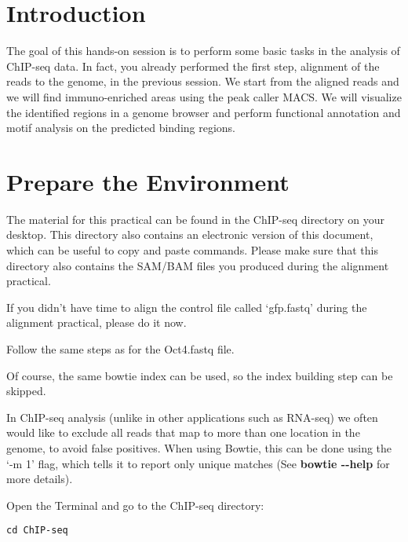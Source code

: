 \newpage

\section{Introduction}

\begin{information}
The goal of this hands-on session is to perform some basic tasks in the analysis of ChIP-seq data. In fact, you already performed the first step, alignment of the reads to the genome, in the previous session. We start from the aligned reads and we will find immuno-enriched areas using the peak caller MACS. We will visualize the identified regions in a genome browser and perform functional annotation and motif analysis on the predicted binding regions.
\end{information}

\section{Prepare the Environment}

\begin{information}
The material for this practical can be found in the ChIP-seq directory on your desktop. This directory also contains an electronic version of this document, which can be useful to copy and paste commands. Please make sure that this directory also contains the SAM/BAM files you produced during the alignment practical. 
\end{information}

\begin{steps}
If you didn't have time to align the control file called `gfp.fastq' during the alignment practical, please do it now. 

Follow the same steps as for the Oct4.fastq file.

Of course, the same bowtie index can be used, so the index building step can be skipped.
\end{steps}

\begin{note}
In ChIP-seq analysis (unlike in other applications such as RNA-seq) we often would like to exclude all reads that map to more than one location in the genome, to avoid false positives. When using Bowtie, this can be done using the `-m 1' flag, which tells it to report only unique matches (See \textbf{bowtie -{}-help} for more details). 
\end{note}


\begin{steps}
Open the Terminal and go to the ChIP-seq directory:
\begin{lstlisting}
cd ChIP-seq
\end{lstlisting}
\end{steps}

